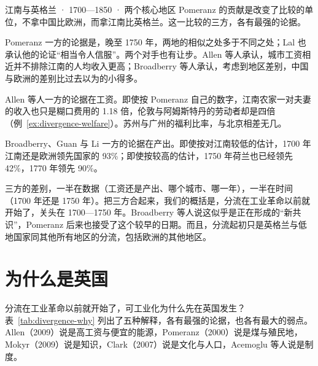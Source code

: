 \begin{case}{江南与英格兰 · 1700—1850 · 两个核心地区}
Pomeranz 的贡献是改变了比较的单位，不拿中国比欧洲，而拿江南比英格兰。这一比较的三方，各有最强的论据。

Pomeranz 一方的论据是，晚至 1750 年，两地的相似之处多于不同之处；Lal 也承认他的论证“相当令人信服”\cite{lal2000}。两个对手也有让步。Allen 等人承认，城市工资相近并不排除江南的人均收入更高\cite{allen2009wp}；Broadberry 等人承认，考虑到地区差别，中国与欧洲的差别比过去以为的小得多\cite{bgl2017}。

Allen 等人一方的论据在工资。即使按 Pomeranz 自己的数字，江南农家一对夫妻的收入也只是糊口费用的 1.18 倍，伦敦与阿姆斯特丹的劳动者却是四倍（例~\ref{ex:divergence-welfare}）。苏州与广州的福利比率，与北京相差无几\cite{allen2009wp}。

Broadberry、Guan 与 Li 一方的论据在产出。即使按对江南较低的估计，1700 年江南还是欧洲领先国家的 93\%；即使按较高的估计，1750 年荷兰也已经领先 42\%，1770 年领先 90\%\cite{bgl2017}。

三方的差别，一半在数据（工资还是产出、哪个城市、哪一年），一半在时间（1700 年还是 1750 年）。把三方合起来，我们的概括是，分流在工业革命以前就开始了，关头在 1700—1750 年。Broadberry 等人说这似乎是正在形成的“新共识”，Pomeranz 后来也接受了这个较早的日期\cite{bgl2017}。而且，分流起初只是英格兰与低地国家同其他所有地区的分流，包括欧洲的其他地区。
\end{case}


\section{为什么是英国}\label{sec:divergence-why}

分流在工业革命以前就开始了，可工业化为什么先在英国发生？表~\ref{tab:divergence-why} 列出了五种解释，各有最强的论据，也各有最大的弱点。Allen（2009）说是高工资与便宜的能源，Pomeranz（2000）说是煤与殖民地，Mokyr（2009）说是知识，Clark（2007）说是文化与人口，Acemoglu 等人说是制度。

